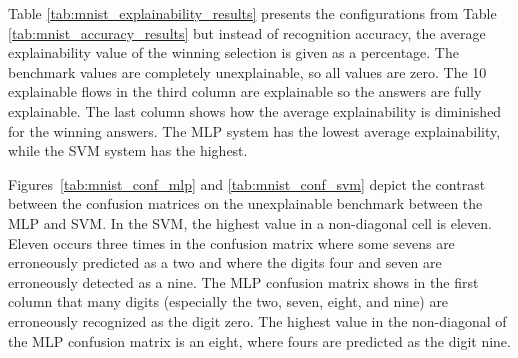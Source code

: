 Table \ref{tab:mnist_explainability_results} presents the configurations from
Table \ref{tab:mnist_accuracy_results} but instead of recognition accuracy, the
average explainability value of the winning selection is given as a percentage.
The benchmark values are completely unexplainable, so all values are zero.  The
10 explainable flows in the third column are explainable so the answers are
fully explainable.  The last column shows how the average explainability is
diminished for the winning answers.  The MLP system has the lowest average
explainability, while the SVM system has the highest.

Figures~\ref{tab:mnist_conf_mlp} and \ref{tab:mnist_conf_svm} depict the
contrast between the confusion matrices on the unexplainable benchmark between
the MLP and SVM.  In the SVM, the highest value in a non-diagonal cell is
eleven.  Eleven occurs three times in the confusion matrix where some sevens are
erroneously predicted as a two and where the digits four and seven are
erroneously detected as a nine. The MLP confusion matrix shows in the first
column that many digits (especially the two, seven, eight, and nine) are
erroneously recognized as the digit zero.  The highest value in the non-diagonal
of the MLP confusion matrix is an eight, where fours are predicted as the digit
nine.


